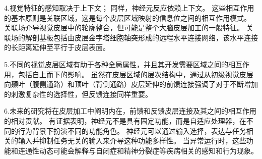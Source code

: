 4.视觉特征的感知取决于上下文；
同样，神经元反应依赖上下文。
这些相互作用的基本原则是关联区域，这是每个皮层区域映射的信息位之间的相互作用模式。
关联场介导视觉皮层中的轮廓整合，但可能是整个大脑皮层加工的一般特征。
关联场的解剖基板包括由皮层金字塔细胞轴突形成的远程水平连接网络，该水平连接的长距离延伸至平行于皮层表面。 


5.不同的视觉皮层区域有助于各种全局属性，并且其开发需要区域之间的相互作用，包括自上而下的影响。
虽然在皮层区域的层次结构中，通过从初级视觉皮层向颞叶（腹侧通路）和顶叶（背侧通路）皮层延伸的前馈连接强调了对于不断增加的刺激复杂性的选择性，但反馈连接同样重要。 


6.未来的研究将在皮层加工中阐明内在，前馈和反馈皮层连接及其之间的相互作用的相对贡献。
有证据表明，神经元不是具有固定功能，而是自适应处理器，在不同的行为背景下扮演不同的功能角色。
神经元可以通过输入选择，表达与任务相关的输入并抑制任务无关的输入来介导这种功能多样性。
当异常运行时，这些功能和连通性动态可能会解释与自闭症和精神分裂症等疾病相关的感知和行为现象。

